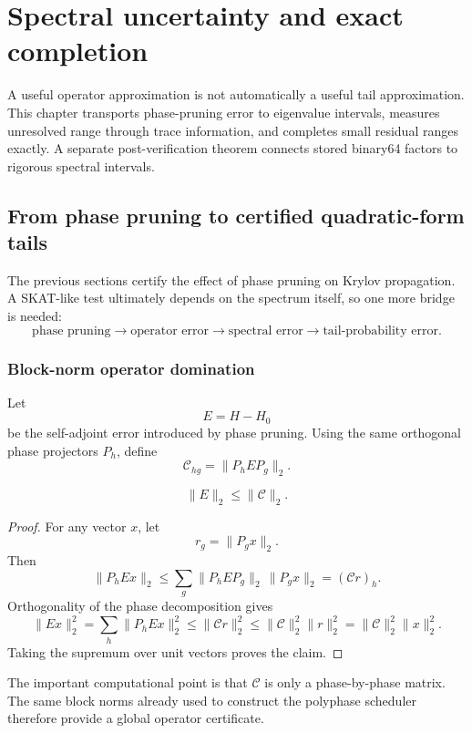 \chapter{Spectral uncertainty and exact completion}\label{ch:spectrum}
A useful operator approximation is not automatically a useful tail
approximation. This chapter transports phase-pruning error to eigenvalue
intervals, measures unresolved range through trace information, and completes
small residual ranges exactly. A separate post-verification theorem connects
stored binary64 factors to rigorous spectral intervals.
\section{From phase pruning to certified quadratic-form tails}\label{sec:final-22}

The previous sections certify the effect of phase pruning on Krylov
propagation.  A SKAT-like test ultimately depends on the spectrum itself, so
one more bridge is needed:
\[
\text{phase pruning}
\longrightarrow
\text{operator error}
\longrightarrow
\text{spectral error}
\longrightarrow
\text{tail-probability error}.
\]

\subsection{Block-norm operator domination}

Let
\[
E=H-H_0
\]
be the self-adjoint error introduced by phase pruning.  Using the same
orthogonal phase projectors \(P_h\), define
\[
\mathcal C_{hg}
=
\|P_hEP_g\|_2.
\]

\begin{theorem}\label{claim:final-22-1}
\[
\boxed{
\|E\|_2
\le
\|\mathcal C\|_2.
}
\]
\end{theorem}

\begin{proof}
For any vector \(x\), let
\[
r_g=\|P_gx\|_2.
\]
Then
\[
\|P_hEx\|_2
\le
\sum_g
\|P_hEP_g\|_2\,\|P_gx\|_2
=
(\mathcal C r)_h.
\]
Orthogonality of the phase decomposition gives
\[
\|Ex\|_2^2
=
\sum_h\|P_hEx\|_2^2
\le
\|\mathcal C r\|_2^2
\le
\|\mathcal C\|_2^2\|r\|_2^2
=
\|\mathcal C\|_2^2\|x\|_2^2.
\]
Taking the supremum over unit vectors proves the claim.
\end{proof}

The important computational point is that \(\mathcal C\) is only a
phase-by-phase matrix.  The same block norms already used to construct the
polyphase scheduler therefore provide a global operator certificate.

